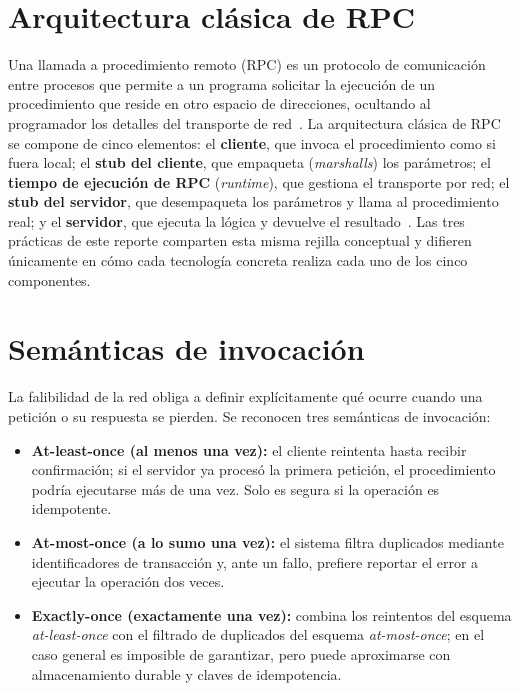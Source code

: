 \section{Arquitectura clásica de RPC}

Una llamada a procedimiento remoto (RPC) es un protocolo de comunicación entre procesos que permite a un programa solicitar la ejecución de un procedimiento que reside en otro espacio de direcciones, ocultando al programador los detalles del transporte de red~\cite{birrell1984rpc}. La arquitectura clásica de RPC se compone de cinco elementos: el \textbf{cliente}, que invoca el procedimiento como si fuera local; el \textbf{stub del cliente}, que empaqueta (\emph{marshalls}) los parámetros; el \textbf{tiempo de ejecución de RPC} (\emph{runtime}), que gestiona el transporte por red; el \textbf{stub del servidor}, que desempaqueta los parámetros y llama al procedimiento real; y el \textbf{servidor}, que ejecuta la lógica y devuelve el resultado~\cite{coulouris2011distributed,tanenbaum2007distributed}. Las tres prácticas de este reporte comparten esta misma rejilla conceptual y difieren únicamente en cómo cada tecnología concreta realiza cada uno de los cinco componentes.

\section{Semánticas de invocación}

La falibilidad de la red obliga a definir explícitamente qué ocurre cuando una petición o su respuesta se pierden. Se reconocen tres semánticas de invocación:

\begin{itemize}
    \item \textbf{At-least-once (al menos una vez):} el cliente reintenta hasta recibir confirmación; si el servidor ya procesó la primera petición, el procedimiento podría ejecutarse más de una vez. Solo es segura si la operación es idempotente.
    \item \textbf{At-most-once (a lo sumo una vez):} el sistema filtra duplicados mediante identificadores de transacción y, ante un fallo, prefiere reportar el error a ejecutar la operación dos veces.
    \item \textbf{Exactly-once (exactamente una vez):} combina los reintentos del esquema \emph{at-least-once} con el filtrado de duplicados del esquema \emph{at-most-once}; en el caso general es imposible de garantizar, pero puede aproximarse con almacenamiento durable y claves de idempotencia.
\end{itemize}

